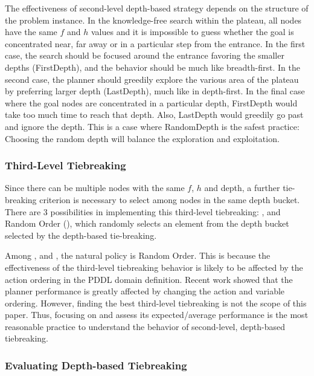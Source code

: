 The effectiveness of second-level depth-based strategy depends on the
structure of the problem instance.  In the knowledge-free search within
the plateau, all nodes have the same $f$ and $h$ values
and it is impossible to guess whether the goal is concentrated near, far
away or in a particular step from the entrance.  In the first case, the
search should be focused around the entrance favoring the smaller depths
(FirstDepth), and the behavior should be much like breadth-first. In the
second case, the planner should greedily explore the various area of the
plateau by preferring larger depth (LastDepth), much like in
depth-first. In the final case where the goal nodes are concentrated in
a particular depth, FirstDepth would take too much time to reach that
depth. Also, LastDepth would greedily go past and ignore the depth.
This is a case
where RandomDepth is the safest practice: 
Choosing the random depth will balance the exploration and exploitation.

\subsubsection{Third-Level Tiebreaking}

Since there can be multiple nodes with the same $f$, $h$ and depth,
a further tie-breaking criterion is necessary to select among nodes in the same depth bucket.
There are 3 possibilities in implementing this third-level tiebreaking:
\fifo, \lifo and Random Order (\ro), which
randomly selects an element from the depth bucket selected by the depth-based tie-breaking.

Among \fifo, \lifo and \ro, the natural policy is Random Order.
This is because the effectiveness of the third-level tiebreaking behavior
is likely to be affected by the action ordering in the PDDL domain
definition.  Recent work \cite{vallati2015effective} showed that the
planner performance is greatly affected by changing the action and
variable ordering. However, finding the best third-level tiebreaking is
not the scope of this paper.
Thus, focusing on \ro and assess its expected/average
performance is the most reasonable practice to understand the behavior of second-level,
depth-based tiebreaking.


\subsubsection{Evaluating Depth-based Tiebreaking}

